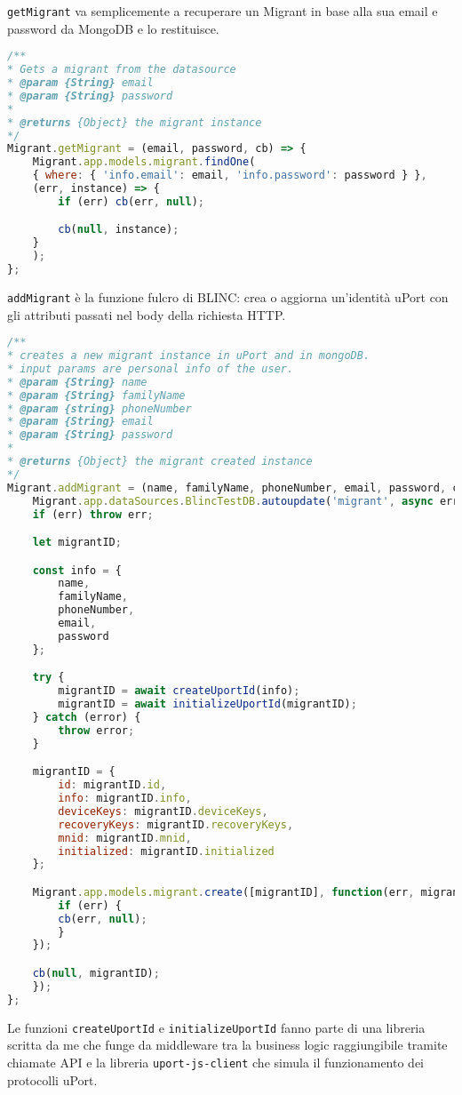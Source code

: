 \texttt{getMigrant} va semplicemente a recuperare un Migrant in base alla sua
email e password da MongoDB e lo restituisce.

\begin{lstlisting}[language=JavaScript, numbers=none]
/**
* Gets a migrant from the datasource
* @param {String} email
* @param {String} password
*
* @returns {Object} the migrant instance
*/
Migrant.getMigrant = (email, password, cb) => {
    Migrant.app.models.migrant.findOne(
    { where: { 'info.email': email, 'info.password': password } },
    (err, instance) => {
        if (err) cb(err, null);

        cb(null, instance);
    }
    );
};
\end{lstlisting}

\texttt{addMigrant} è la funzione fulcro di BLINC: crea o aggiorna un'identità uPort con gli
attributi passati nel body della richiesta HTTP.

\begin{lstlisting}[language=JavaScript, numbers=none]
/**
* creates a new migrant instance in uPort and in mongoDB.
* input params are personal info of the user.
* @param {String} name
* @param {String} familyName
* @param {string} phoneNumber
* @param {String} email
* @param {String} password
*
* @returns {Object} the migrant created instance
*/
Migrant.addMigrant = (name, familyName, phoneNumber, email, password, cb) => {
    Migrant.app.dataSources.BlincTestDB.autoupdate('migrant', async err => {
    if (err) throw err;

    let migrantID;

    const info = {
        name,
        familyName,
        phoneNumber,
        email,
        password
    };

    try {
        migrantID = await createUportId(info);
        migrantID = await initializeUportId(migrantID);
    } catch (error) {
        throw error;
    }

    migrantID = {
        id: migrantID.id,
        info: migrantID.info,
        deviceKeys: migrantID.deviceKeys,
        recoveryKeys: migrantID.recoveryKeys,
        mnid: migrantID.mnid,
        initialized: migrantID.initialized
    };

    Migrant.app.models.migrant.create([migrantID], function(err, migrant) {
        if (err) {
        cb(err, null);
        }
    });

    cb(null, migrantID);
    });
};
\end{lstlisting}

Le funzioni \texttt{createUportId} e \texttt{initializeUportId} fanno parte di una libreria scritta da me
che funge da middleware tra la business logic raggiungibile tramite chiamate API
e la libreria \texttt{uport-js-client} che simula il funzionamento dei protocolli uPort.

